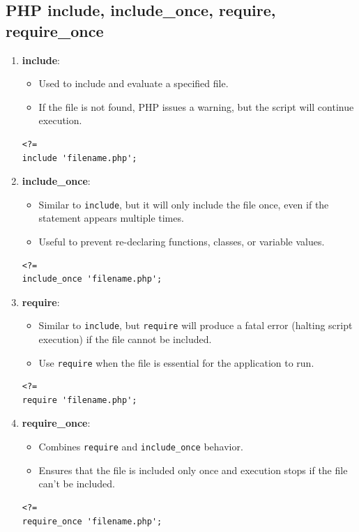 \documentclass[11pt]{article}
\begin{document}
\subsection{PHP include, include\_once, require, require\_once}
\label{sec:orga1f8f82}
\begin{enumerate}
\item \textbf{include}:
\begin{itemize}
\item Used to include and evaluate a specified file.
\item If the file is not found, PHP issues a warning, but the script will
continue execution.
\end{itemize}

\begin{verbatim}
<?=
include 'filename.php';
\end{verbatim}

\item \textbf{include\_once}:

\begin{itemize}
\item Similar to \texttt{include}, but it will only include the file once, even
if the statement appears multiple times.
\item Useful to prevent re-declaring functions, classes, or variable
values.
\end{itemize}

\begin{verbatim}
<?=
include_once 'filename.php';
\end{verbatim}

\item \textbf{require}:

\begin{itemize}
\item Similar to \texttt{include}, but \texttt{require} will produce a fatal error
(halting script execution) if the file cannot be included.
\item Use \texttt{require} when the file is essential for the application to
run.
\end{itemize}

\begin{verbatim}
<?=
require 'filename.php';
\end{verbatim}

\item \textbf{require\_once}:

\begin{itemize}
\item Combines \texttt{require} and \texttt{include\_once} behavior.
\item Ensures that the file is included only once and execution stops if
the file can't be included.
\end{itemize}

\begin{verbatim}
<?=
require_once 'filename.php';
\end{verbatim}
\end{enumerate}
\end{document}
